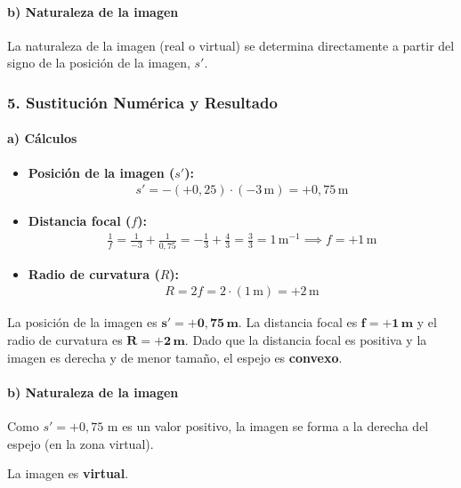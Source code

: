 \paragraph{b) Naturaleza de la imagen}
La naturaleza de la imagen (real o virtual) se determina directamente a partir del signo de la posición de la imagen, $s'$.

\subsubsection*{5. Sustitución Numérica y Resultado}
\paragraph{a) Cálculos}
\begin{itemize}
    \item \textbf{Posición de la imagen ($s'$):}
    \begin{gather}
        s' = -(+0,25) \cdot (-3 \, \text{m}) = +0,75 \, \text{m}
    \end{gather}
    \item \textbf{Distancia focal ($f$):}
    \begin{gather}
        \frac{1}{f} = \frac{1}{-3} + \frac{1}{0,75} = -\frac{1}{3} + \frac{4}{3} = \frac{3}{3} = 1 \, \text{m}^{-1} \implies f = +1 \, \text{m}
    \end{gather}
    \item \textbf{Radio de curvatura ($R$):}
    \begin{gather}
        R = 2f = 2 \cdot (1 \, \text{m}) = +2 \, \text{m}
    \end{gather}
\end{itemize}
\begin{cajaresultado}
La posición de la imagen es $\boldsymbol{s' = +0,75 \, \textbf{m}}$. La distancia focal es $\boldsymbol{f = +1 \, \textbf{m}}$ y el radio de curvatura es $\boldsymbol{R = +2 \, \textbf{m}}$. Dado que la distancia focal es positiva y la imagen es derecha y de menor tamaño, el espejo es \textbf{convexo}.
\end{cajaresultado}
\paragraph{b) Naturaleza de la imagen}
Como $s' = +0,75$ m es un valor positivo, la imagen se forma a la derecha del espejo (en la zona virtual).
\begin{cajaresultado}
La imagen es \textbf{virtual}.
\end{cajaresultado}

